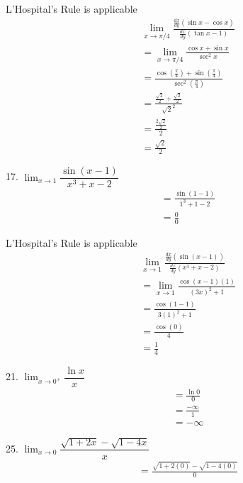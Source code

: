 \documentclass{article}
\begin{document}
\begin{description}
\begin{description}
                L'Hospital's Rule is applicable
                \begin{align*}
                   & \lim_{x\to\pi/4}\frac{\frac{dx}{dy}(\sin{x} - \cos{x})}{\frac{dx}{dy}(\tan{x} - 1)}                            \\[1em]
                   & = \lim_{x\to\pi/4}\frac{\cos{x}+\sin{x}}{\sec^2{x}}                                                            \\[1em]
                   & = \frac{\cos{\left(\frac{\pi}{4}\right)}+\sin{\left(\frac{\pi}{4}\right)}}{\sec^2{\left(\frac{\pi}{4}\right)}} \\[1em]
                   & = \frac{\frac{\sqrt{2}}{2}+\frac{\sqrt{2}}{2}}{\sqrt{2}^2}                                                     \\[1em]
                   & = \frac{\frac{2\sqrt{2}}{2}}{2}                                                                                \\[1em]
                   & = \boxed{\frac{\sqrt{2}}{2}}
                \end{align*}
          \item 17. $\lim_{x\to1} \dfrac{\sin{(x-1)}}{x^3 + x - 2}$
                \begin{align*}
                   & = \frac{\sin{(1-1)}}{1^3 + 1 - 2} \\
                   & = \frac{0}{0}
                \end{align*}

                L'Hospital's Rule is applicable
                \begin{align*}
                   & \lim_{x\to1}\frac{\frac{dx}{dy}(\sin{(x-1)})}{\frac{dx}{dy}(x^3 + x - 2)} \\[1em]
                   & = \lim_{x\to1}\frac{\cos{(x-1)}(1)}{(3x)^2 + 1}                           \\[1em]
                   & = \frac{\cos{(1-1)}}{3(1)^2 + 1}                                          \\[1em]
                   & = \frac{\cos{(0)}}{4}                                                     \\[1em]
                   & = \boxed{\frac{1}{4}}
                \end{align*}
          \item 21. $\lim_{x\to0^{+}} \dfrac{\ln{x}}{x}$
                \begin{align*}
                   & = \frac{\ln{0}}{0}  \\[1em]
                   & = \frac{-\infty}{1} \\[1em]
                   & = \boxed{-\infty}
                \end{align*}
          \item 25. $\lim_{x\to0} \dfrac{\sqrt{1 + 2x} - \sqrt{1 - 4x}}{x}$
                \begin{align*}
                   & = \frac{\sqrt{1 + 2(0)} - \sqrt{1 - 4(0)}}{0}
                \end{align*}


\end{description}
\end{description}
\end{document}
